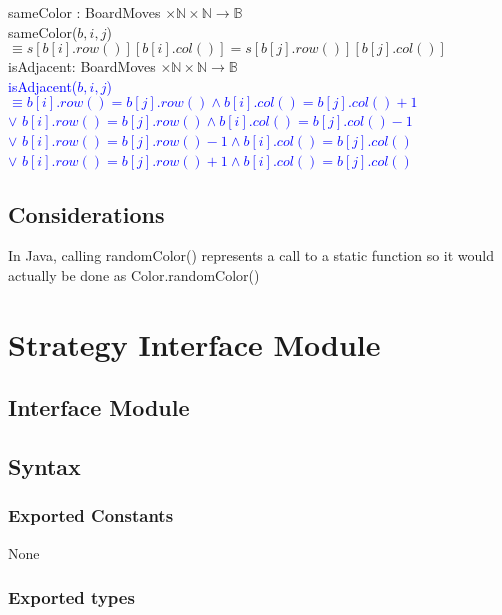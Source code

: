 \documentclass[12pt]{article}
\begin{document}
\noindent sameColor : BoardMoves $\times \mathbb{N} \times \mathbb{N} \rightarrow \mathbb{B} $\\
\noindent sameColor($b,i,j$) $\equiv s[b[i].row()][b[i].col()] = s[b[j].row()][b[j].col()]$\\

\noindent isAdjacent: BoardMoves $\times \mathbb{N} \times \mathbb{N} \rightarrow \mathbb{B}$\\
\noindent \textcolor{blue}{isAdjacent($b,i,j$) $\equiv b[i].row() = b[j].row() \land b[i].col() = b[j].col() + 1$\\
$\lor$  $b[i].row() = b[j].row() \land b[i].col() = b[j].col() - 1$\\
$\lor$  $b[i].row() = b[j].row() - 1 \land b[i].col() = b[j].col()$\\
$\lor$  $b[i].row() = b[j].row() + 1 \land b[i].col() = b[j].col()$ }\\

\subsection*{Considerations}
\noindent In Java, calling randomColor() represents a call to a static function so it would actually be done as Color.randomColor()


\newpage

\section* {Strategy Interface Module}

\subsection* {Interface Module}


\subsection* {Syntax}

\subsubsection* {Exported Constants}

None

\subsubsection* {Exported types}
\end{document}
